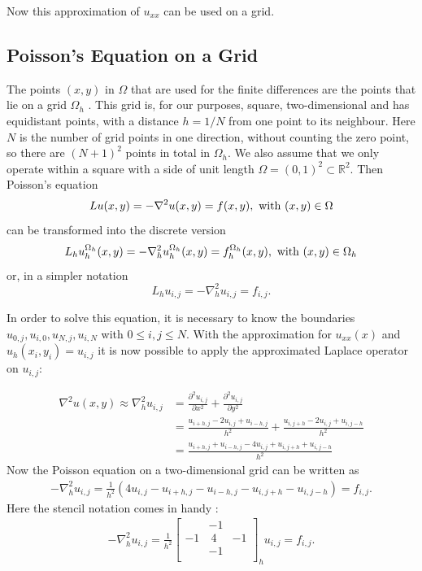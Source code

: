 Now this approximation of $u_{xx}$ can be used on a grid. 

\subsection{Poisson's Equation on a Grid}
The points $(x,y)$ in $\Omega$ that are used for the finite differences are the points that lie on a grid $\Omega_h$ \cite{Trottenberg:2000:MUL:374106}. This grid is, for our purposes, square, two-dimensional and has equidistant points, with a distance $h = 1/N$ from one point to its neighbour. Here $N$ is the number of grid points in one direction, without counting the zero point, so there are $(N+1)^2$ points in total in $\Omega_h$. We also assume that we only operate within a square with a side of unit length $\Omega = (0,1)^2 \subset \mathbb{R}^2$. Then Poisson's equation
\begin{equation}
L u(x,y) = -\nabla^2 u(x,y) = f(x,y), \textnormal{ with } (x,y) \in \Omega
\end{equation}
can be transformed into the discrete version
\begin{equation}
L_h u^{\Omega_h}_h(x,y) = -\nabla^2_h u^{\Omega_h}_h (x,y) = f^{\Omega_h}_h(x,y), \textnormal{ with } (x,y) \in \Omega_h
\end{equation}
or, in a simpler notation
\begin{equation}
L_h u_{i,j} = -\nabla^2_h u_{i,j} = f_{i,j}.
\end{equation}


In order to solve this equation, it is necessary to know the boundaries $u_{0,j}, u_{i,0}, u_{N,j}, u_{i, N}$ with $0 \leq i,j \leq N$.
With the approximation for $u_{xx}(x)$ and $u_h (x_i,y_i) = u_{i,j}$ it is now possible to apply the approximated Laplace operator on $u_{i,j}$:

\begin{align}
\nabla^2 u(x,y) \approx \nabla^2_h u_{i,j}   &= \frac{\partial^2 u_{i,j} }{\partial x^2} + \frac{\partial^2 u_{i,j} }{\partial y^2} \nonumber \\
                      &= \frac{u_{i+h,j} - 2 u_{i,j} + u_{i-h,j} }{h^2} + \frac{u_{i,j+h} - 2 u_{i,j} + u_{i,j-h} }{h^2}\\
                      &= \frac{u_{i+h,j} + u_{i-h,j} - 4 u_{i,j} + u_{i,j+h} + u_{i,j-h} }{h^2} \nonumber
\end{align}
Now the Poisson equation on a two-dimensional grid can be written as
\begin{align}
-\nabla^2_h u_{i,j} = \frac{1}{h^2} (4 u_{i,j} -u_{i+h,j} - u_{i-h,j}  - u_{i,j+h} - u_{i,j-h} ) = f_{i,j}.
\end{align}
Here the stencil notation comes in handy \cite{Trottenberg:2000:MUL:374106}:
\begin{align}
-\nabla^2_h u_{i,j} = \frac{1}{h^2} 
\begin{bmatrix}
& -1 & \\
-1 & ~4 & -1 \\
& -1 & \\
\end{bmatrix}_h u_{i,j}
= f_{i,j}.
\label{equ:dis_poisson}
\end{align}

